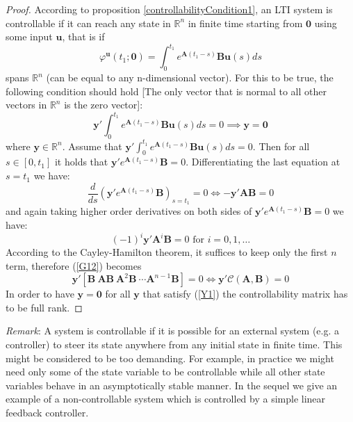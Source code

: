 \documentclass[a4paper,10pt,oneside]{book}
\begin{document}
\begin{proof}
 According to proposition \ref{controllabilityCondition1}, an LTI system is controllable if it can reach any state in $\mathbb{R}^n$ in finite time starting from $\mathbf{0}$ using some input $\mathbf{u}$, that is if
\begin{equation}
 \varphi^{\mathbf{u}}(t_1;\mathbf{0})=\int_0^{t_1}e^{\mathbf{A}(t_1-s)}\mathbf{Bu}(s)ds
\end{equation}
spans $\mathbb{R}^n$ (can be equal to any n-dimensional vector). For this to be true, the following condition should hold [The only vector that is normal to all other vectors in $\mathbb{R}^n$ is the zero vector]:
\begin{equation}
 \mathbf{y}'\int_0^{t_1}e^{\mathbf{A}(t_1-s)}\mathbf{Bu}(s)ds=0 \implies \mathbf{y}=\mathbf{0}
\end{equation}
where $\mathbf{y}\in\mathbb{R}^n$. Assume that $\mathbf{y}'\int_0^{t_1}e^{\mathbf{A}(t_1-s)}\mathbf{Bu}(s)ds=0$. Then for all $s\in [0,t_1]$ it holds that $\mathbf{y}'e^{\mathbf{A}(t_1-s)}\mathbf{B}=0$. Differentiating the last equation at $s=t_1$ we have:
\begin{equation}
 \frac{d}{ds}\left(\mathbf{y}'e^{\mathbf{A}(t_1-s)}\mathbf{B}\right)_{s=t_1}=0 \Leftrightarrow -\mathbf{y}'\mathbf{AB}=0 
\end{equation}
and again taking higher order derivatives on both sides of $\mathbf{y}'e^{\mathbf{A}(t_1-s)}\mathbf{B}=0$ we have:
\begin{equation}
 (-1)^i\mathbf{y}'\mathbf{A}^i\mathbf{B}=0 \text{ for } i=0,1,\ldots\label{G12}
\end{equation}
According to the Cayley-Hamilton theorem, it suffices to keep only the first $n$ term, therefore (\ref{G12}) becomes
\begin{equation}
 \mathbf{y}'[\mathbf{B}\ \mathbf{AB}\ \mathbf{A}^2\mathbf{B} \ \cdots \mathbf{A}^{n-1}\mathbf{B}]=0 \Leftrightarrow \mathbf{y}'\mathcal{C}(\mathbf{A},\mathbf{B})=0 \label{Y1}
\end{equation}
In order to have $\mathbf{y}=\mathbf{0}$ for all $\mathbf{y}$ that satisfy (\ref{Y1}) the controllability matrix has to be full rank.
\end{proof}
\emph{Remark}: A system is controllable if it is possible for an external system (e.g. a controller) to steer its state anywhere from any initial state in finite time. This might be considered to be too demanding. For example, in practice we might need only some of the state variable to be controllable while all other state variables behave in an asymptotically stable manner. In the sequel we give an example of a non-controllable system which is controlled by a simple linear feedback controller.
\end{document}
